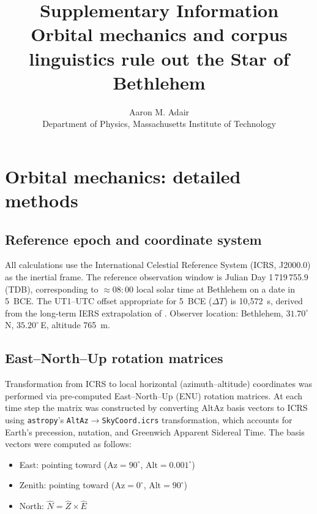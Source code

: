 \documentclass[11pt,a4paper]{article}
\title{\textbf{Supplementary Information}\\[6pt]
  \large Orbital mechanics and corpus linguistics rule out the Star of Bethlehem}
\author{Aaron M. Adair\\
  Department of Physics, Massachusetts Institute of Technology}
\date{}
\begin{document}
\maketitle

\section{Orbital mechanics: detailed methods}

\subsection{Reference epoch and coordinate system}

All calculations use the International Celestial Reference System (ICRS,
J2000.0) as the inertial frame. The reference observation window is Julian
Day 1\,719\,755.9 (TDB), corresponding to $\approx\!08{:}00$ local solar time
at Bethlehem on a date in 5~BCE. The UT1--UTC offset appropriate for 5~BCE
($\Delta T$) is 10,572~s, derived from the long-term IERS extrapolation of
\cite{morrison2004}. Observer location: Bethlehem,
$31.70^\circ$\,N, $35.20^\circ$\,E, altitude 765~m.

\subsection{East--North--Up rotation matrices}

Transformation from ICRS to local horizontal (azimuth--altitude) coordinates
was performed via pre-computed East--North--Up (ENU) rotation matrices. At
each time step the matrix was constructed by converting AltAz basis vectors
to ICRS using \texttt{astropy}'s \texttt{AltAz}$\to$\texttt{SkyCoord.icrs}
transformation, which accounts for Earth's precession, nutation, and
Greenwich Apparent Sidereal Time. The basis vectors were computed as follows:

\begin{itemize}
  \item East: pointing toward ($\mathrm{Az}=90^\circ$, $\mathrm{Alt}=0.001^\circ$)
  \item Zenith: pointing toward ($\mathrm{Az}=0^\circ$, $\mathrm{Alt}=90^\circ$)
  \item North: $\hat{N} = \hat{Z} \times \hat{E}$
\end{itemize}
\end{document}
